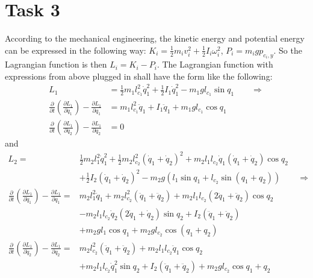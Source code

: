 \documentclass[a4paper,12pt,oneside,onecolumn]{article} %
\begin{document}
\section*{Task 3}
According to the mechanical engineering, the kinetic energy and potential energy can be expressed in the following way: $K_i = \frac{1}{2} m_i v_i^2 + \frac{1}{2} I_i \omega_i^2$, $P_i = m_i g p_{c_i, y}$. So the Lagrangian function is then $L_i = K_i - P_i$. The Lagrangian function with expressions from above plugged in shall have the form like the following:
\begin{equation}
\begin{aligned}
L_1 & = \frac{1}{2} m_1 l_{c_1}^2 \dot{q}_1^2 + \frac{1}{2} I_1 \dot{q}_1^2 - m_1 g l_{c_1} \sin{q_1} \qquad \Rightarrow \\
\frac{\partial}{\partial t}(\frac{\partial L_1}{\partial \dot{q}_1}) - \frac{\partial L_1}{\partial q_1} & = m_1 l_{c_1}^2 \ddot{q}_1 + I_1 \ddot{q}_1 + m_1 g l_{c_1} \cos{q_1} \\
\frac{\partial}{\partial t}(\frac{\partial L_1}{\partial \dot{q}_2}) - \frac{\partial L_1}{\partial q_2} & = 0
\end{aligned}
\end{equation}
and
\begin{equation}
\begin{aligned}
L_2 = & \frac{1}{2} m_2 l_1^2 \dot{q}_1^2 + \frac{1}{2} m_2 l_{c_2}^2 (\dot{q}_1 + \dot{q}_2)^2 + m_2 l_1 l_{c_2} \dot{q}_1 (\dot{q}_1 + \dot{q}_2) \cos{q_2} \\ 
& + \frac{1}{2} I_2 (\dot{q}_1 + \dot{q}_2)^2  - m_2 g (l_1 \sin{q_1} + l_{c_2}\sin{(q_1+q_2)}) \qquad \Rightarrow \\
\frac{\partial}{\partial t}(\frac{\partial L_1}{\partial \dot{q}_1}) - \frac{\partial L_1}{\partial q_1} = & m_2 l_1^2 \ddot{q}_1 + m_2 l_{c_2}^2 (\ddot{q}_1+\ddot{q}_2) + m_2 l_1 l_{c_2} (2\ddot{q}_1 + \ddot{q}_2) \cos{q_2} \\
& - m_2 l_1 l_{c_2} \dot{q}_2 (2\dot{q}_1 + \dot{q}_2) \sin{q_2} + I_2 (\ddot{q}_1 + \ddot{q}_2) \\
& + m_2 g l_1 \cos{q_1} + m_2 g l_{c_2} \cos{(q_1 + q_2)} \\
\frac{\partial}{\partial t}(\frac{\partial L_1}{\partial \dot{q}_2}) - \frac{\partial L_1}{\partial q_2} = & m_2 l_{c_2}^2 (\ddot{q}_1 + \ddot{q}_2)  + m_2 l_1 l_{c_2} \ddot{q}_1 \cos{q_2} \\
& + m_2 l_1 l_{c_2}\dot{q}_1^2 \sin{q_2} + I_2 (\ddot{q}_1 + \ddot{q}_2) + m_2 g l_{c_2} \cos{q_1 + q_2}
\end{aligned}
\end{equation}
\end{document}
